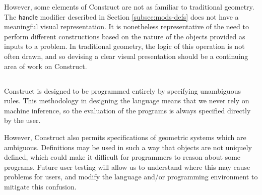 \documentclass[twoside,openright,11pt]{report}
\begin{document}
However, some elements of Construct are not as familiar to traditional geometry. 
The $\mathsf{handle}$ modifier described in Section \ref{subsec:mods-defs} does not have a meaningful visual representation.
It is nonetheless representative of the need to perform different constructions based on the nature of the objects provided as inputs to a problem. 
In traditional geometry, the logic of this operation is not often drawn, and so devising a clear visual presentation should be a continuing area of work on Construct.

\subsection{\constructgoalsnoinfer}

Construct is designed to be programmed entirely by specifying unambiguous rules.
This methodology in designing the language means that we never rely on machine inference, so the evaluation of the programs is always specified directly by the user.

However, Construct also permits specifications of geometric systems which are ambiguous. 
Definitions may be used in such a way that objects are not uniquely defined, which could make it difficult for programmers to reason about some programs. 
Future user testing will allow us to understand where this may cause problems for users, and modify the language and/or programming environment to mitigate this confusion.

\subsection{\constructgoalscomplete}

\appendix



\end{document}
